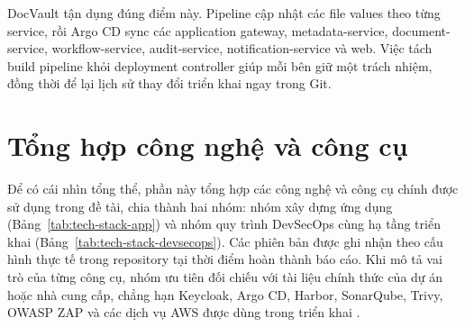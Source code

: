 DocVault tận dụng đúng điểm này. Pipeline cập nhật các file values theo từng service, rồi Argo CD sync các application gateway, metadata-service, document-service, workflow-service, audit-service, notification-service và web. Việc tách build pipeline khỏi deployment controller giúp mỗi bên giữ một trách nhiệm, đồng thời để lại lịch sử thay đổi triển khai ngay trong Git.

\section{Tổng hợp công nghệ và công cụ}

Để có cái nhìn tổng thể, phần này tổng hợp các công nghệ và công cụ chính được sử dụng trong đề tài, chia thành hai nhóm: nhóm xây dựng ứng dụng (Bảng~\ref{tab:tech-stack-app}) và nhóm quy trình DevSecOps cùng hạ tầng triển khai (Bảng~\ref{tab:tech-stack-devsecops}). Các phiên bản được ghi nhận theo cấu hình thực tế trong repository tại thời điểm hoàn thành báo cáo. Khi mô tả vai trò của từng công cụ, nhóm ưu tiên đối chiếu với tài liệu chính thức của dự án hoặc nhà cung cấp, chẳng hạn Keycloak, Argo CD, Harbor, SonarQube, Trivy, OWASP ZAP và các dịch vụ AWS được dùng trong triển khai \cite{keycloak_docs,argocd_docs,harbor_docs,sonarqube_docs,trivy_docs,zap_baseline,aws_eks_irsa,aws_s3_kms}.

